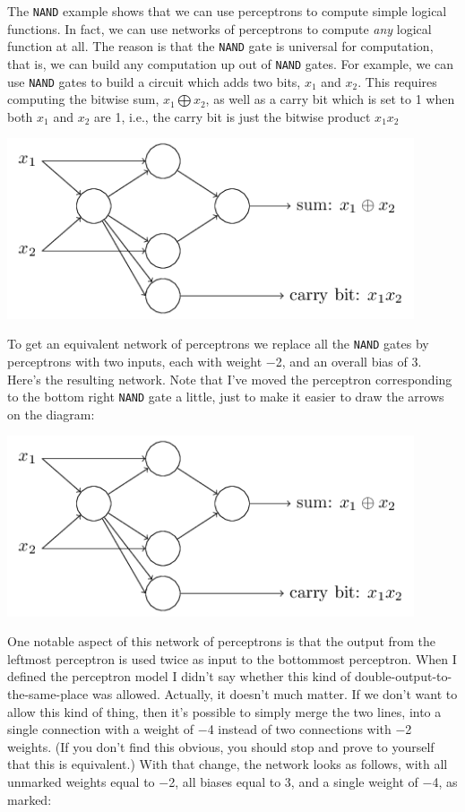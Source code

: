 The \lstinline{NAND} example shows that we can use perceptrons to compute simple logical functions. In fact, we can use networks of perceptrons to compute \textit{any} logical function at all. The reason is that the \lstinline{NAND} gate is universal for computation, that is, we can build any computation up out of \lstinline{NAND} gates. For example, we can use \lstinline{NAND} gates to build a circuit which adds two bits, $x_1$ and $x_2$. This requires computing the bitwise sum, $x_1\bigoplus x_2$, as well as a carry bit which is set to 1 when both $x_1$ and $x_2$ are 1, i.e., the carry bit is just the bitwise product $x_1 x_2$

{\centering
\includegraphics[width=0.9\textwidth,]{pic/perceptronadder}
\par}

To get an equivalent network of perceptrons we replace all the \lstinline{NAND} gates by perceptrons with two inputs, each with weight $-$2, and an overall bias of 3. Here's the resulting network. Note that I've moved the perceptron corresponding to the bottom right \lstinline{NAND} gate a little, just to make it easier to draw the arrows on the diagram: 

{\centering
\includegraphics[width=0.9\textwidth,]{pic/perceptronadder}
\par}

One notable aspect of this network of perceptrons is that the output from the leftmost perceptron is used twice as input to the bottommost perceptron. When I defined the perceptron model I didn't say whether this kind of double-output-to-the-same-place was allowed. Actually, it doesn't much matter. If we don't want to allow this kind of thing, then it's possible to simply merge the two lines, into a single connection with a weight of $-$4 instead of two connections with $-$2 weights. (If you don't find this obvious, you should stop and prove to yourself that this is equivalent.) With that change, the network looks as follows, with all unmarked weights equal to $-$2, all biases equal to 3, and a single weight of $-$4, as marked: 

